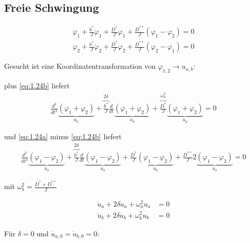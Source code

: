         \subsection{Freie Schwingung}

            \begin{align}
                \ddot{\varphi}_1 + \frac{b^\ast}{J}\dot{\varphi}_1 + \frac{D^\ast}{J}\varphi_1 + \frac{D^{\ast\ast}}{J}(\varphi_1 - \varphi_2) = 0\label{eq:1.24a}\\
                \ddot{\varphi}_2 + \frac{b^\ast}{J}\dot{\varphi}_2 + \frac{D^\ast}{J}\varphi_2 + \frac{D^{\ast\ast}}{J}(\varphi_2 - \varphi_1) = 0\label{eq:1.24b}
            \end{align}

            Gesucht ist eine Koordinatentransformation von \(\varphi_{1,2} \rightarrow u_{a,b}\):\par\medskip

             plus \cref{eq:1.24b} liefert
            \begin{align}
                \frac{d^2}{dt^2} \underbrace{(\varphi_1 + \varphi_2)}_{u_a} + \overbrace{\frac{b^\ast}{J}}^{2\delta} \frac{d}{dt} \underbrace{(\varphi_1 + \varphi_2)}_{u_a} + \overbrace{\frac{D^\ast}{J}}^{\omega_a^2} \underbrace{(\varphi_1 + \varphi_2)}_{u_a} = 0\label{eq:1.25}
            \end{align}

            und \cref{eq:1.24a} minus \cref{eq:1.24b} liefert
            \begin{align}
                \frac{d^2}{dt^2} \underbrace{(\varphi_1 - \varphi_2)}_{u_b} + \overbrace{\frac{b^\ast}{J}}^{2\delta} \frac{d}{dt} \underbrace{(\varphi_1 - \varphi_2)}_{u_b} + \frac{D^\ast}{J}\underbrace{(\varphi_1 - \varphi_2)}_{u_b} + \frac{D^{\ast\ast}}{J}2\underbrace{(\varphi_1 - \varphi_2)}_{u_b} = 0\label{eq:1.26}
            \end{align}

            mit \(\omega_b^2 = \frac{D^\ast + D^{\ast\ast}}{J}\)

            \begin{align}
                \ddot{u}_a + 2\delta\dot{u}_a + \omega_a^2 u_a &= 0\label{eq:1.25a}\\
                \ddot{u}_b + 2\delta\dot{u}_b + \omega_b^2 u_b &= 0\label{eq:1.25b}
            \end{align}

            Für \(\delta = 0\) und \(\dot{u}_{a,0} = \dot{u}_{b,0} = 0\):

